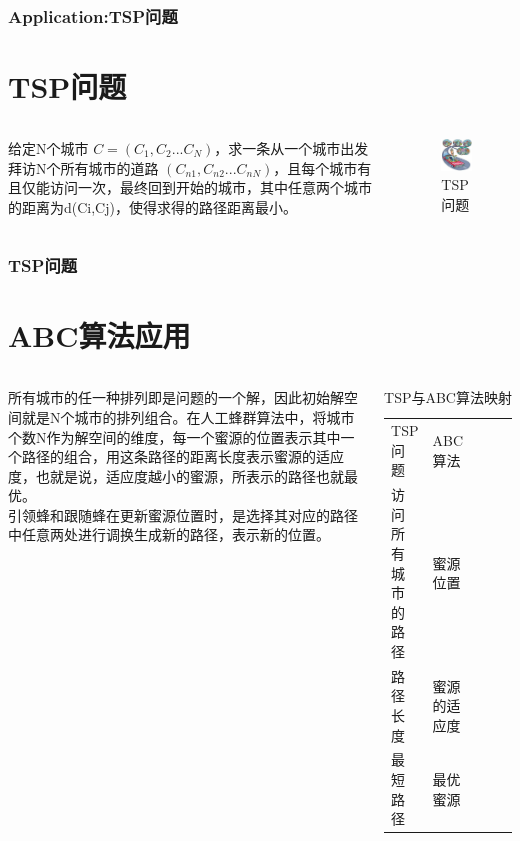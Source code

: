 \begin{frame}
	\frametitle{Application:TSP问题}
	\section {TSP问题}
	\begin{columns}
	\qquad 给定N个城市 $C=(C_{1},C_{2}...C_{N})$，求一条从一个城市出发拜访N个所有城市的道路 $(C_{n1},C_{n2}...C_{nN})$，且每个城市有且仅能访问一次，最终回到开始的城市，其中任意两个城市的距离为d(Ci,Cj)，使得求得的路径距离最小。
	\begin{figure}[htbp]
		\flushleft
		\includegraphics[width=3cm]{pic/bee6.jpg}
		\caption{TSP问题}
	\end{figure}
	\end{columns}
\end{frame}

\begin{frame}
	\frametitle{TSP问题}
	\section {ABC算法应用}
	\begin{columns}
	\column{.6\textwidth}
	\qquad 所有城市的任一种排列即是问题的一个解，因此初始解空间就是N个城市的排列组合。在人工蜂群算法中，将城市个数N作为解空间的维度，每一个蜜源的位置表示其中一个路径的组合，用这条路径的距离长度表示蜜源的适应度，也就是说，适应度越小的蜜源，所表示的路径也就最优。\\
	\qquad 引领蜂和跟随蜂在更新蜜源位置时，是选择其对应的路径中任意两处进行调换生成新的路径，表示新的位置。
	\column{.4\textwidth}
	\begin{table}[]
	\centering
	\caption{TSP与ABC算法映射}
	\label{my-label}
	\begin{tabular}{|l|l|lll}
	\cline{1-2}
	TSP问题     & ABC算法  &  &  &  \\ \cline{1-2}
	访问所有城市的路径 & 蜜源位置   &  &  &  \\ \cline{1-2}
	路径长度      & 蜜源的适应度 &  &  &  \\ \cline{1-2}	
	最短路径      & 最优蜜源   &  &  &  \\ \cline{1-2}
	\end{tabular}
	\end{table}
	\end{columns}
\end{frame}

